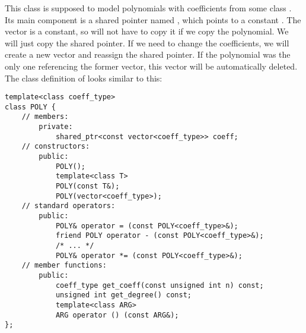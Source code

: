 This class is supposed to model polynomials with coefficients from some class . Its main component is a shared pointer named , which points to a constant . The vector is a constant, so will not have to copy it if we copy the polynomial. We will just copy the shared pointer. If we need to change the coefficients, we will create a new vector and reassign the shared pointer. If the polynomial was the only one referencing the former vector, this vector will be automatically deleted. The class definition of  looks similar to this:

\begin{lstlisting}
template<class coeff_type>
class POLY {
	// members:
		private:
			shared_ptr<const vector<coeff_type>> coeff;
	// constructors:
		public:
			POLY();
			template<class T>
			POLY(const T&);
			POLY(vector<coeff_type>);
	// standard operators:
		public:
			POLY& operator = (const POLY<coeff_type>&);
			friend POLY operator - (const POLY<coeff_type>&);
			/* ... */
			POLY& operator *= (const POLY<coeff_type>&);
	// member functions:
		public:
			coeff_type get_coeff(const unsigned int n) const;
			unsigned int get_degree() const;
			template<class ARG>
			ARG operator () (const ARG&);
};
\end{lstlisting}

